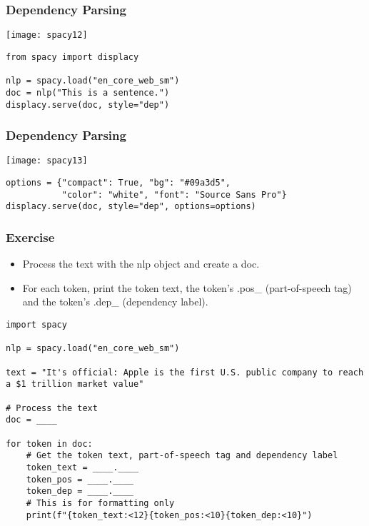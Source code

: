 \begin{frame}[fragile]\frametitle{Dependency Parsing}

\begin{center}
\texttt{[image: spacy12]}
\end{center}


\begin{lstlisting}
from spacy import displacy

nlp = spacy.load("en_core_web_sm")
doc = nlp("This is a sentence.")
displacy.serve(doc, style="dep")
\end{lstlisting}



\end{frame}

\begin{frame}[fragile]\frametitle{Dependency Parsing}

\begin{center}
\texttt{[image: spacy13]}
\end{center}


\begin{lstlisting}
options = {"compact": True, "bg": "#09a3d5",
           "color": "white", "font": "Source Sans Pro"}
displacy.serve(doc, style="dep", options=options)
\end{lstlisting}


\end{frame}



\begin{frame}[fragile]\frametitle{Exercise}

  \begin{itemize}
    \item Process the text with the nlp object and create a doc.
    \item For each token, print the token text, the token's .pos\_ (part-of-speech tag) and the token's .dep\_ (dependency label).
  \end{itemize}

  \begin{lstlisting}
import spacy

nlp = spacy.load("en_core_web_sm")

text = "It's official: Apple is the first U.S. public company to reach a $1 trillion market value"

# Process the text
doc = ____

for token in doc:
    # Get the token text, part-of-speech tag and dependency label
    token_text = ____.____
    token_pos = ____.____
    token_dep = ____.____
    # This is for formatting only
    print(f"{token_text:<12}{token_pos:<10}{token_dep:<10}")
  \end{lstlisting}
	
\end{frame}
